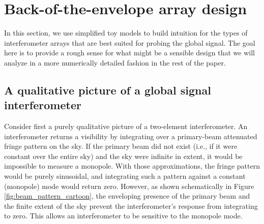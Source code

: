 \documentclass[twocolumn,apj,numberedappendix]{emulateapj}
\newcommand{\acl}[1]{{\color{red} \textbf{[ACL:  #1]}}}
\newcommand{\mep}[1]{{\color{applegreen} \textbf{[MEP:  #1]}}}
\begin{document}

%

\section{Back-of-the-envelope array design}
\label{sec:BackOfEnvelopeArrayDesign}

In this section, we use simplified toy models to build intuition for the types of interferometer arrays that are best suited for probing the global signal.  The goal here is to provide a rough sense for what might be a sensible design that we will analyze in a more numerically detailed fashion in the rest of the paper.

\subsection{A qualitative picture of a global signal interferometer}

Consider first a purely qualitative picture of a two-element interferometer. An interferometer returns a visibility by integrating over a primary-beam attenuated fringe pattern on the sky. If the primary beam did not exist (i.e., if it were constant over the entire sky) and the sky were infinite in extent, it would be impossible to measure a monopole. With those approximations, the fringe pattern would be purely sinusoidal, and integrating such a pattern against a constant (monopole) mode would return zero. However, as shown schematically in Figure \ref{fig:beam_pattern_cartoon}, the enveloping presence of the primary beam and the finite extent of the sky prevent the interferometer's response from integrating to zero. This allows an interferometer to be sensitive to the monopole mode.
\end{document}
